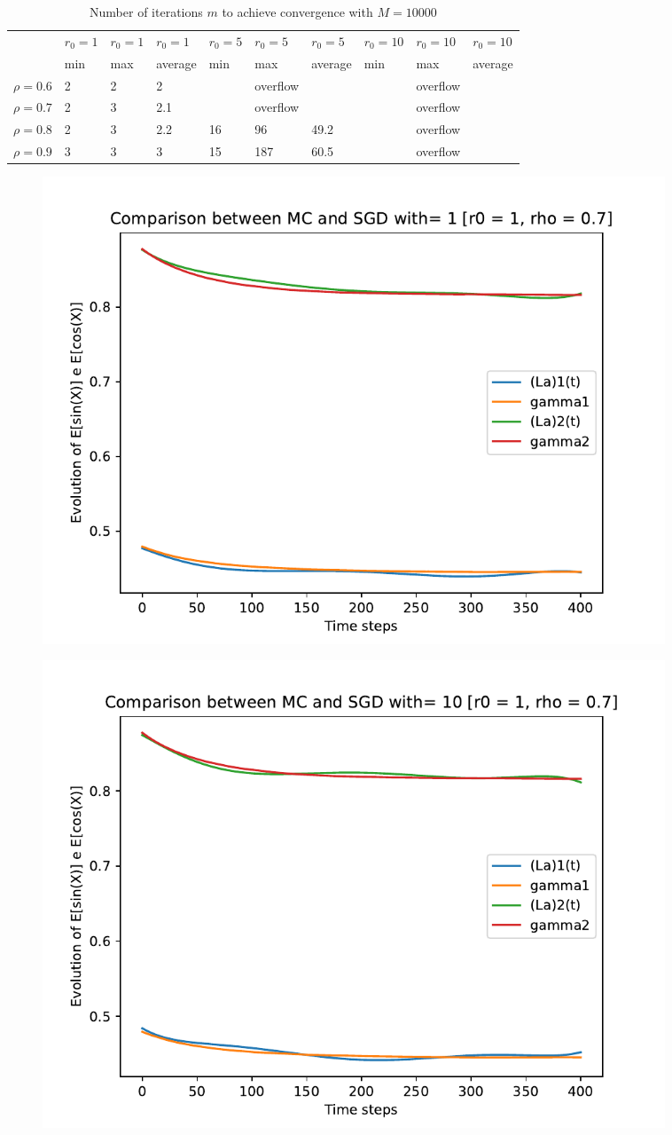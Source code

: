 \documentclass[a4paper,11pt,openright]{report}
\begin{document}
\begin{table}[H]
\centering
\addtolength{\leftskip}{-1.5cm}
\addtolength{\rightskip}{-1.5cm}
\begin{tabular}{|c|lllllllll|}
\hline
$ $ & $r_0 = 1$ & $r_0 = 1$ & $r_0 = 1$ & $r_0 = 5$ & $r_0 = 5$ & $r_0 = 5$ & $r_0 = 10$ & $r_0 = 10$ & $r_0 = 10$  \\
$ $ & min & max & average & min & max & average & min & max & average \\ 
\hline
$\rho = 0.6$ & 2 & 2 & 2 &  & overflow &  &  & overflow &  \\

$\rho = 0.7$ & 2 & 3 & 2.1 &  & overflow &  &  & overflow &  \\

$\rho = 0.8$ & 2 & 3 & 2.2 & 16 & 96 & 49.2 &  & overflow &  \\

$\rho = 0.9$ & 3 & 3 & 3 & 15 & 187 & 60.5 &  & overflow &  \\
\hline
\end{tabular}
\caption{Number of iterations $m$ to achieve convergence with $M = 10000$}
\end{table}
\begin{figure}[H]
\centering
\includegraphics[width=0.9\textwidth]{images/graphics T = 4/n = 6, M = 1 sine and cosine.pdf}
\end{figure}
\begin{figure}[H]
\centering
\includegraphics[width=0.9\textwidth]{images/graphics T = 4/n = 6, M = 10 sine and cosine.pdf}
\end{figure}
\end{document}
